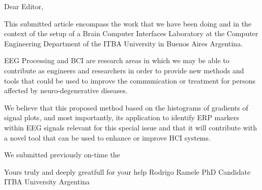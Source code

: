 Dear Editor, 

This submitted article encompass the work that we have been doing and in the context of the setup of a Brain Computer Interfaces Laboratory at the Computer Engineering Department of the ITBA University in Buenos Aires Argentina.

EEG Processing and BCI are research areas in which we may be able to contribute as engineers and researchers in order to provide new methods and tools that could be used to improve the communication or treatment for persons affected by neuro-degenerative diseases.

We believe that this proposed method based on the histograms of gradients of signal plots, and most importantly, its  application to identify ERP markers within EEG signals relevant for this special issue and that it will contribute with a novel tool that can be used to enhance or improve HCI systems.

We submitted previously on-time the  

Yours truly and deeply greatfull for your help
Rodrigo Ramele
PhD Candidate
ITBA University 
Argentina